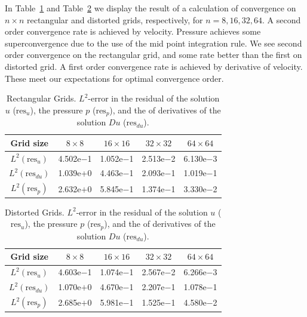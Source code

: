 In Table~\ref{tab:table2} and Table~\ref{tab:table3} we display the result of a 
calculation of convergence on $n\times n$ rectangular and distorted grids, 
respectively, for $n=8,16,32,64$. A second order convergence rate is achieved by 
velocity. Pressure achieves some superconvergence due to the use of the mid 
point integration rule. We see second order convergence on
the rectangular grid, and some rate better than the first on distorted grid.
A first order convergence rate 
is achieved by derivative of velocity. These meet our expectations for optimal convergence order.
\begin{table}[ht]
    \centering
     \begin{tabular}{c | c c c c}
     Grid size & $8\times8$ & $16\times 16$ & $32\times32$ & $64 \times 64$ \\
     \hline
     $L^2(\text{res}_u)$ & 4.502e$-$1 & 1.052e$-$1 & 2.513e$-$2 & 6.130e$-$3 \\
				 $L^2(\text{res}_{du})$ & 1.039e+0 & 4.463e$-$1 & 2.093e$-$1 & 1.019e$-$1 \\
     $L^2(\text{res}_{p})$ & 2.632e$+$0 & 5.845e$-$1 & 1.374e$-$1 & 3.330e$-$2 \\
    \end{tabular}
    \caption{Rectangular Grids. $L^2$-error in the residual of the solution $u$ ($\text{res}_u$), the pressure $p$ ($\text{res}_p$), and the of derivatives of the solution $Du$ ($\text{res}_{du}$).}
    \label{tab:table2}
\end{table}

\begin{table}[ht]
    \centering
    \begin{tabular}{c | c c c c}
     Grid size & $8\times8$ & $16\times 16$ & $32\times32$ & $64 \times 64$ \\
     \hline
     $L^2(\text{res}_u)$ & 4.603e$-$1 & 1.074e$-$1 & 2.567e$-$2 & 6.266e$-$3 \\
				$L^2(\text{res}_{du})$ & 1.070e$+$0 & 4.670e$-$1 & 2.207e$-$1 & 1.078e$-$1 \\
				$L^2(\text{res}_{p})$ & 2.685e$+$0 & 5.981e$-$1 & 1.525e$-$1 & 4.580e$-$2 \\
    \end{tabular}
    \caption{Distorted Grids. $L^2$-error in the residual of the solution $u$ ($\text{res}_u$), the pressure $p$ ($\text{res}_p$), and the of derivatives of the solution $Du$ ($\text{res}_{du}$).}
    \label{tab:table3}
\end{table}
